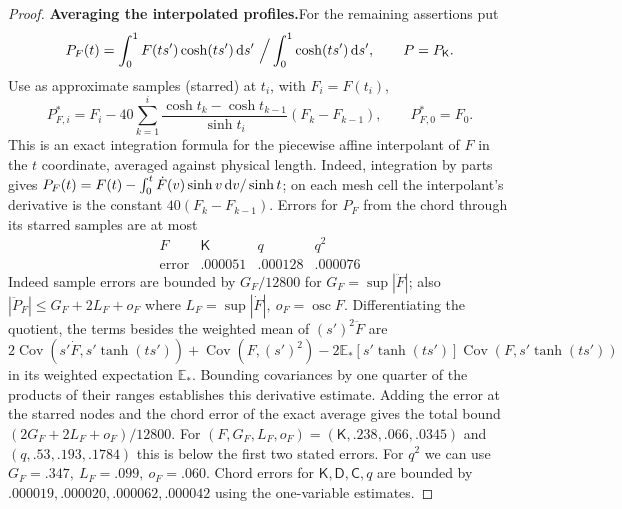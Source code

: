 \begin{proof}
\smallskip \noindent\textbf{Averaging the interpolated profiles.}\quad For the remaining assertions put
\[
 P_F(t)=\int_0^1 F(ts')\cosh(ts')\,\rd s'\ \Big/\int_0^1\cosh(ts')\,\rd s',
 \qquad P=P_{\mathsf K}.
\]
Use as approximate samples (starred) at $t_i$, with $F_i=F(t_i)$,
\[
 P_{F,i}^*=F_i-40\sum_{k=1}^i\frac{\cosh t_k-\cosh t_{k-1}}{\sinh t_i}(F_k-F_{k-1}),
 \qquad P_{F,0}^*=F_0.
\]
This is an exact integration formula for the piecewise affine interpolant of $F$ in the $t$ coordinate, averaged against physical length. Indeed, integration by parts gives $P_F(t)=F(t)-\int_0^t\dot F(v)\sinh v\,\mathrm{d} v/\sinh t$; on each mesh cell the interpolant's derivative is the constant $40(F_k-F_{k-1})$. Errors for $P_F$ from the chord through its starred samples are at most
\[
\begin{array}{c|ccc}
 F&\mathsf K&q&q^2\\\hline
 \text{error}&.000051&.000128&.000076
\end{array}
\]
Indeed sample errors are bounded by $G_F/12800$ for $G_F=\sup |\ddot F|$; also $|\ddot P_F|\le G_F+2L_F+o_F$ where $L_F=\sup|\dot F|,\ o_F=\operatorname{osc} F$. Differentiating the quotient, the terms besides the weighted mean of $(s')^2\ddot F$ are $2\operatorname{Cov}(s'\dot F,s'\tanh(ts'))+\operatorname{Cov}(F,(s')^2) -2\mathbb{E}_*[s'\tanh(ts')]\operatorname{Cov}(F,s'\tanh(ts'))$ in its weighted expectation $\mathbb{E}_*$. Bounding covariances by one quarter of the products of their ranges establishes this derivative estimate. Adding the error at the starred nodes and the chord error of the exact average gives the total bound $(2G_F+2L_F+o_F)/12800$. For $(F,G_F,L_F,o_F)=(\mathsf K,.238,.066,.0345)$ and $(q,.53,.193,.1784)$ this is below the first two stated errors. For $q^2$ we can use $G_F=.347,\ L_F=.099,\ o_F=.060$. Chord errors for $\mathsf K,\mathsf D,\mathsf C,q$ are bounded by $.000019,.000020,.000062,.000042$ using the one-variable estimates.


\end{proof}
